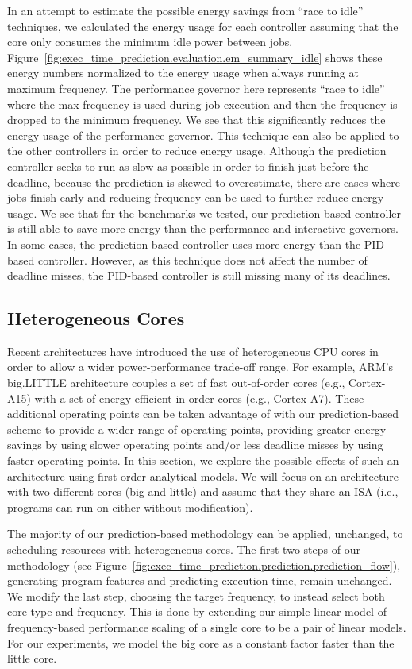 In an attempt to estimate the possible energy savings from ``race to idle''
techniques, we calculated the energy usage for each controller assuming that
the core only consumes the minimum idle power between jobs.
Figure~\ref{fig:exec_time_prediction.evaluation.em_summary_idle} shows these
energy numbers normalized to the energy usage when always running at maximum
frequency. The performance governor here represents ``race to idle'' where the
max frequency is used during job execution and then the frequency is dropped to
the minimum frequency. We see that this significantly reduces the energy usage
of the performance governor. This technique can also be applied to the other
controllers in order to reduce energy usage. Although the prediction controller
seeks to run as slow as possible in order to finish just before the deadline,
because the prediction is skewed to overestimate, there are cases where jobs
finish early and reducing frequency can be used to further reduce energy usage.
We see that for the benchmarks we tested, our prediction-based controller is
still able to save more energy than the performance and interactive governors.
In some cases, the prediction-based controller uses more energy than the PID-based 
controller. However, as this technique does not affect the number of deadline
misses, the PID-based controller is still missing many of its deadlines.

\subsection{Heterogeneous Cores}

Recent architectures have introduced the use of heterogeneous CPU cores in
order to allow a wider power-performance trade-off range. For example, ARM's
big.LITTLE architecture couples a set of fast out-of-order cores (e.g.,
Cortex-A15) with a set of energy-efficient in-order cores (e.g., Cortex-A7).
These additional operating points can be taken advantage of with our
prediction-based scheme to provide a wider range of operating points, providing
greater energy savings by using slower operating points and/or less deadline
misses by using faster operating points. In this section, we explore the
possible effects of such an architecture using first-order analytical models.
We will focus on an architecture with two different cores (big and little) and
assume that they share an ISA (i.e., programs can run on either without
modification).

The majority of our prediction-based methodology can be applied, unchanged, to
scheduling resources with heterogeneous cores. The first two steps of our
methodology (see
Figure~\ref{fig:exec_time_prediction.prediction.prediction_flow}), generating
program features and predicting execution time, remain unchanged. We modify
the last step, choosing the target frequency, to instead select both core type and
frequency.  This is done by extending our simple linear model of
frequency-based performance scaling of a single core to be a pair of linear
models. For our experiments, we model the big core as a constant factor faster
than the little core.

